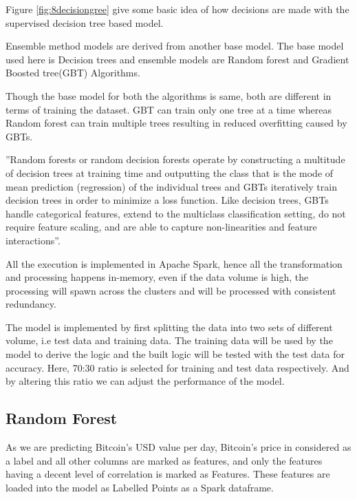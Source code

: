 \documentclass[sigconf]{acmart}
\begin{document}
Figure \ref{fig:8decisiongree} give some basic idea of how decisions are made with the supervised decision tree based model.

Ensemble method models are derived from another base model. The base model used here is Decision trees and ensemble models are Random forest and Gradient Boosted tree(GBT) Algorithms.

Though the base model for both the algorithms is same, both are different in terms of training the dataset. GBT can train only one tree at a time whereas Random forest can train multiple trees resulting in reduced overfitting caused by GBTs.

''Random forests or random decision forests operate by constructing a multitude of decision trees at training time and outputting the class that is the mode of mean prediction (regression) of the individual trees and GBTs iteratively train decision trees in order to minimize a loss function. Like decision trees, GBTs handle categorical features, extend to the multiclass classification setting, do not require feature scaling, and are able to capture non-linearities and feature interactions''\cite{Ensemble4:online}.

All the execution is implemented in Apache Spark, hence all the transformation and processing happens in-memory, even if the data volume is high, the processing will spawn across the clusters and will be processed with consistent redundancy.

The model is implemented by first splitting the data into two sets of different volume, i.e test data and training data. The training data will be used by the model to derive the logic and the built logic will be tested with the test data for accuracy. Here, 70:30 ratio is selected for training and test data respectively. And by altering this ratio we can adjust the performance of the model.

\subsection{Random Forest}
As we are predicting Bitcoin's USD value per day, Bitcoin's price in considered as a label and all other columns are marked as features, and only the features having a decent level of correlation is marked as Features. These features are loaded into the model as Labelled Points as a Spark dataframe.
\end{document}
